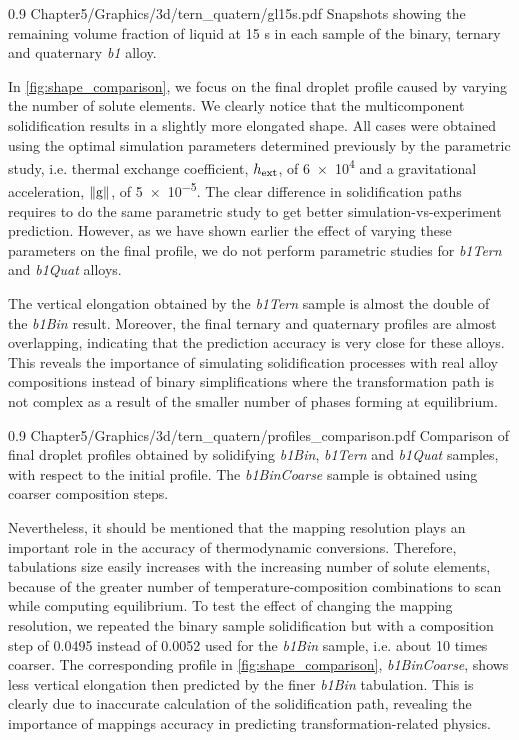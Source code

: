\begin{figureth}
{0.9}
{Chapter5/Graphics/3d/tern_quatern/gl15s.pdf}
{Snapshots showing the remaining volume fraction of liquid at 15 s in each sample of the binary, ternary and quaternary \emph{b1} alloy.}
\label{fig:multicomp_liquid}
\end{figureth}

In \cref{fig:shape_comparison}, we focus on the final droplet profile caused by varying the number of solute elements.
We clearly notice that the multicomponent solidification results in a slightly more elongated shape. 
All cases were obtained using the optimal simulation
parameters determined previously by the parametric study, i.e. thermal exchange coefficient, $h_{\text{ext}}$, of \SI{6e4}{\uhconvec} and a gravitational
acceleration, $\lVert \boldsymbol{\text{g}} \rVert$, of \SI{5e-5}{\uacceleration}. The clear difference in solidification paths requires to do the same 
parametric study to get better simulation-vs-experiment prediction. However, as we have shown earlier the effect of varying these parameters
on the final profile, we do not perform parametric studies for \emph{b1Tern} and \emph{b1Quat} alloys. 

The vertical elongation obtained by the \emph{b1Tern} sample is almost the double of the \emph{b1Bin} result. Moreover, the final ternary and quaternary
profiles are almost overlapping, indicating that the prediction accuracy is very close for these alloys. 
This reveals the importance of simulating solidification processes with real alloy compositions instead of binary simplifications
where the transformation path is not complex as a result of the smaller number of phases forming at equilibrium. 

\begin{figureth}
{0.9}
{Chapter5/Graphics/3d/tern_quatern/profiles_comparison.pdf}
{Comparison of final droplet profiles obtained by solidifying \emph{b1Bin}, \emph{b1Tern} and \emph{b1Quat} samples, with respect to the initial profile. 
The \emph{b1BinCoarse} sample
is obtained using coarser composition steps.}
\label{fig:shape_comparison}
\end{figureth}

Nevertheless, it should be mentioned that the mapping resolution plays an important role in the accuracy of thermodynamic conversions.
Therefore, tabulations size easily increases with the increasing number of solute elements, because of the greater number of temperature-composition 
combinations to scan while computing equilibrium. To test the effect of changing the mapping resolution, we repeated the binary sample solidification
but with a composition step of \SI{0.0495}{\ucomposition} instead of \SI{0.0052}{\ucomposition} used for the \emph{b1Bin} sample, i.e. about 10 times coarser. 
The corresponding profile in \cref{fig:shape_comparison}, \emph{b1BinCoarse}, shows less vertical elongation then predicted by the finer \emph{b1Bin} tabulation. 
This is clearly due to inaccurate calculation of the solidification path, revealing the importance of mappings accuracy in predicting transformation-related physics.

